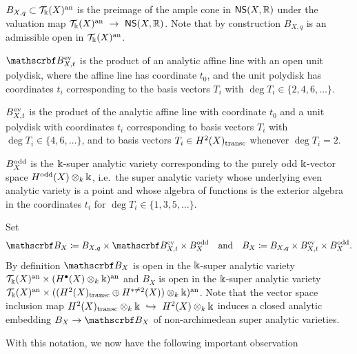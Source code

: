 \documentclass[twoside,leqno]{article}
\numberwithin{equation}{section}
\theoremstyle{plain}
\theoremstyle{definition}
\begin{document}
\begin{description}
\item $B_{X,q} \subset \mathcal{T}_{\Bbbk}(X)^{\operatorname{an}}$ is the preimage of the ample cone in $\mathsf{NS}(X,\mathbb R)$ under the valuation map  \linebreak $\mathcal{T}_{\Bbbk}(X)^{\operatorname{an}} \ \to \ \mathsf{NS}(X,\mathbb R)$.   Note that by construction $B_{X,q}$ is an admissible  open in  $\mathcal{T}_{\Bbbk}(X)^{\operatorname{an}}$.
\item $\omB^{\even}_{X,t}$  is the product of an analytic affine line with an open  unit polydisk, where the affine line has coordinate $t_0$, and the unit polydisk has coordinates $t_i$ corresponding to the basis vectors $T_{i}$ with $\deg T_{i} \in \{2, 4, 6, \ldots\}$. 
\item $B^{\mathrm{ev}}_{X,t}$ is the product of the analytic affine line with coordinate $t_{0}$ and a unit polydisk with coordinates $t_{i}$ corresponding to basis vectors $T_{i}$ with  $\deg T_i \in \{4, 6, \ldots\}$, and to basis vectors $T_{i} \in H^2(X)_{\operatorname{transc}}$ whenever $\deg T_{i} = 2$. 
\item $B^{\mathrm{odd}}_{X}$ is the $\Bbbk$-super analytic variety corresponding to the purely odd $\Bbbk$-vector space $H^{\mathrm{odd}}(X)\otimes_{k} \Bbbk$, i.e.\ the super analytic variety whose underlying even analytic variety is a point and whose algebra of functions is the  exterior algebra in the coordinates $t_i$ for $\deg T_i \in \{1, 3, 5, \dots\}$.
\end{description}

Set 
\begin{equation} \label{eq:non-archimedean_base}
\omB_{X} \coloneqq B_{X,q} \times \omB^{\even}_{X,t}\times B^{\odd}_{X} \quad \text{and} \quad 
B_{X} \coloneqq B_{X,q} \times B^{\even}_{X,t}\times B^{\odd}_{X}.
\end{equation}
By definition $\omB_{X}$ is open in the $\Bbbk$-super analytic variety $\mathcal{T}_{\Bbbk}(X)^{\operatorname{an}}\times (H^{\bullet}(X)\otimes_{k} \Bbbk)^{\operatorname{an}}$ and $B_{X}$ is open in the $\Bbbk$-super analytic variety $\mathcal{T}_{\Bbbk}(X)^{\operatorname{an}}\times ((H^2(X)_{\operatorname{transc}}\oplus H^{*\neq 2}(X))\otimes_{k} \Bbbk)^{\operatorname{an}}$. Note that the vector space inclusion map 
$H^2(X)_{\op{transc}}\otimes_{k} \bbk \ \hookrightarrow  \ H^2(X)\otimes_{k} \bbk$ induces a closed analytic embedding  $B_{X} \to \omB_{X}$ of non-archimedean super analytic varieties.

With this notation, we now have the following important observation
\end{document}
